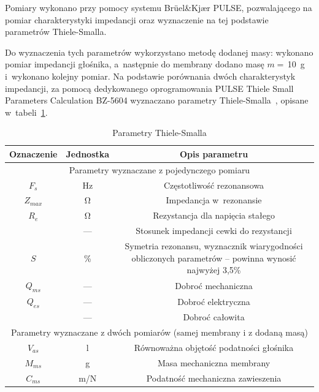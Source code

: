 \documentclass[12pt]{oska}
\begin{document}
			Pomiary wykonano przy pomocy systemu Brüel\&Kjær PULSE, pozwalającego na pomiar charakterystyki impedancji oraz wyznaczenie na tej podstawie parametrów Thiele-Smalla.
			
			Do wyznaczenia tych parametrów wykorzystano metodę dodanej masy: wykonano pomiar impedancji głośnika, a~następnie do membrany dodano masę $m=\,$\SI{10}{\gram} i~wykonano kolejny pomiar. Na podstawie porównania dwóch charakterystyk impedancji, za pomocą dedykowanego oprogramowania PULSE Thiele Small Parameters Calculation BZ-5604 wyznaczano parametry Thiele-Smalla~\cite{BK_pulse_TS}, opisane w~tabeli~\ref{t:TS_opis}.
			
			\begin{table}[!h]
				\centering
				\caption{Parametry Thiele-Smalla}
				\label{t:TS_opis}
				\begin{tabular}{|c|c|c|}
				\hline
					\textbf{Oznaczenie} & \textbf{Jednostka} & \textbf{Opis parametru}\\\hline\hline
					\multicolumn{3}{|c|}{Parametry wyznaczane z pojedynczego pomiaru} \\\hline\hline
					$F_s$ & Hz & Częstotliwość rezonansowa \\\hline
					$Z_{max}$ & \si{\ohm} & Impedancja w~rezonansie \\\hline
					$R_e$ & \si{\ohm} & Rezystancja dla napięcia stałego \\\hline
					\gape{$r_0=\frac{Z_{max}}{R_e}$} & --- & Stosunek impedancji cewki do rezystancji \\\hline
					$S$ & \% & \makecell{Symetria rezonansu, wyznacznik wiarygodności\\obliczonych parametrów -- powinna wynosić najwyżej 3,5\%} \\\hline
					\hline
					$Q_{ms}$ & --- & Dobroć mechaniczna \\\hline
					$Q_{es}$ & --- & Dobroć elektryczna \\\hline
					\gape{$Q_{ts}=\frac{Q_{ms}\cdot Q_{es}}{Q_{ms}+Q_{es}}$} & --- & Dobroć całowita \\\hline
					\hline
					\multicolumn{3}{|c|}{Parametry wyznaczane z dwóch pomiarów (samej membrany i z dodaną masą)} \\\hline\hline
					$V_{as}$ & \si{\litre} & Równoważna objętość podatności głośnika \\\hline
					$M_{ms}$ & \si{\gram} & Masa mechaniczna membrany \\\hline
					$C_{ms}$ & \si[per-mode=symbol]{\metre\per\newton} & Podatność mechaniczna zawieszenia \\\hline

\end{tabular}
\end{table}
\end{document}
